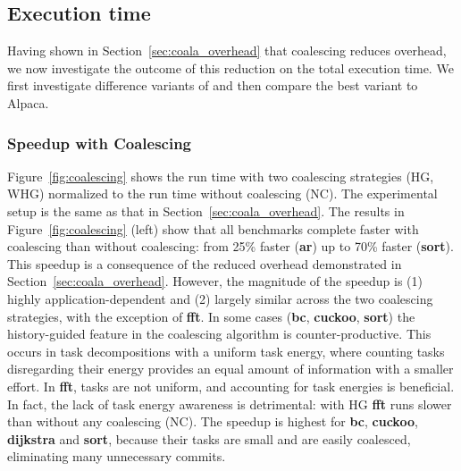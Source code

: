 \subsection{Execution time}
\label{sec:result_coalescing}

Having shown in Section~\ref{sec:coala_overhead} that coalescing reduces
overhead, we now investigate the outcome of this reduction on the total
execution time. We first investigate difference variants of \sys and
then compare the best variant to Alpaca.


\subsubsection{\sys Speedup with Coalescing}

Figure~\ref{fig:coalescing} shows the \sys run time with two coalescing
strategies (HG, WHG) normalized to the run time without coalescing (NC).
%
The experimental setup is the same as that in Section~\ref{sec:coala_overhead}.
%
The results in Figure~\ref{fig:coalescing} (left) show that all benchmarks
complete faster with coalescing than without coalescing: from 25\% faster
(\textbf{ar}) up to 70\% faster (\textbf{sort}).
%
This speedup is a consequence of the reduced overhead demonstrated in
Section~\ref{sec:coala_overhead}.
%
However, the magnitude of the speedup is (1) highly application-dependent and
(2) largely similar across the two coalescing strategies, with the exception of
\textbf{fft}.
%
In some cases (\textbf{bc}, \textbf{cuckoo}, \textbf{sort}) the history-guided
feature in the coalescing algorithm is counter-productive.
%
This occurs in task decompositions with a uniform task energy, where counting
tasks disregarding their energy provides an equal amount of information with a
smaller effort.
%
In \textbf{fft}, tasks are not uniform, and accounting for task energies is
beneficial. In fact, the lack of task energy awareness is detrimental: with HG
\textbf{fft} runs slower than without any coalescing (NC).
%
The speedup is highest for \textbf{bc}, \textbf{cuckoo}, \textbf{dijkstra} and
\textbf{sort}, because their tasks are small and are easily coalesced,
eliminating many unnecessary commits.

